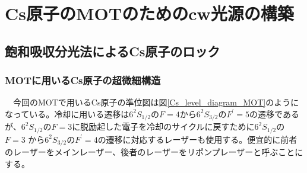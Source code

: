 \documentclass[uplatex, dvipdfmx, a4paper, report, papersize, 11pt]{jsbook}
\begin{document}
\chapter{Cs原子のMOTのためのcw光源の構築}
\section{飽和吸収分光法によるCs原子のロック}
\subsection{MOTに用いるCs原子の超微細構造}
　今回のMOTで用いるCs原子の準位図は図\ref{Cs_level_diagram_MOT}のようになっている。冷却に用いる遷移は$6 ^ { 2 } S _ { 1 / 2 }$の$F = 4$から$6 ^ { 2 } S _ { 3 / 2 }$の$F ^ { \prime } = 5$の遷移であるが、$6 ^ { 2 } S _ { 1 / 2 }$の$F = 3$に脱励起した電子を冷却のサイクルに戻すために$6 ^ { 2 } S _ { 1 / 2 }$の$F = 3$
から$6 ^ { 2 } S _ { 3 / 2 }$の$F ^ { \prime } = 4$の遷移に対応するレーザーも使用する。便宜的に前者のレーザーをメインレーザー、後者のレーザーをリポンプレーザーと呼ぶことにする。
\end{document}
